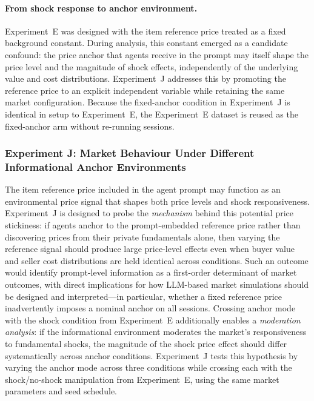 \paragraph{From shock response to anchor environment.}
Experiment~E was designed with the item reference price treated as a fixed background constant.  During analysis, this constant emerged as a candidate confound: the price anchor that agents receive in the prompt may itself shape the price level and the magnitude of shock effects, independently of the underlying value and cost distributions.  Experiment~J addresses this by promoting the reference price to an explicit independent variable while retaining the same market configuration.  Because the fixed-anchor condition in Experiment~J is identical in setup to Experiment~E, the Experiment~E dataset is reused as the fixed-anchor arm without re-running sessions.

\subsubsection{Experiment J: Market Behaviour Under Different Informational Anchor Environments}
\label{sec:exp-anchor}

The item reference price included in the agent prompt may function as an environmental price signal that shapes both price levels and shock responsiveness.  Experiment~J is designed to probe the \emph{mechanism} behind this potential price stickiness: if agents anchor to the prompt-embedded reference price rather than discovering prices from their private fundamentals alone, then varying the reference signal should produce large price-level effects even when buyer value and seller cost distributions are held identical across conditions.  Such an outcome would identify prompt-level information as a first-order determinant of market outcomes, with direct implications for how LLM-based market simulations should be designed and interpreted---in particular, whether a fixed reference price inadvertently imposes a nominal anchor on all sessions.  Crossing anchor mode with the shock condition from Experiment~E additionally enables a \emph{moderation analysis}: if the informational environment moderates the market's responsiveness to fundamental shocks, the magnitude of the shock price effect should differ systematically across anchor conditions.  Experiment~J tests this hypothesis by varying the anchor mode across three conditions while crossing each with the shock/no-shock manipulation from Experiment~E, using the same market parameters and seed schedule.

